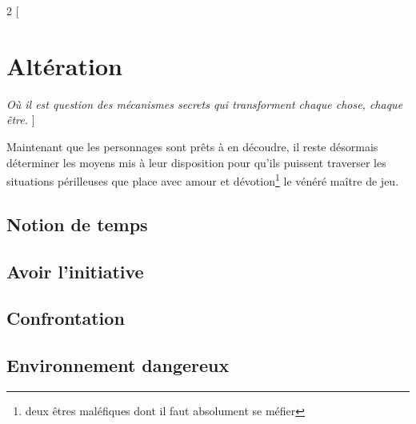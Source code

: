 \documentclass[11pt,oneside]{book}
\begin{document}
\begin{multicols}{2}
    [
        \chapter{Altération}
        \linebreak
        \emph{Où il est question des mécanismes secrets qui transforment chaque chose, chaque être.}
    ]

    Maintenant que les personnages sont prêts à en découdre, il reste désormais déterminer les moyens mis à leur disposition pour qu'ils puissent traverser les situations périlleuses que place avec amour et dévotion\footnote{deux êtres maléfiques dont il faut absolument se méfier} le vénéré maître de jeu.


    \section{Notion de temps}



    \section{Avoir l'initiative}



    \section{Confrontation}








    \section{Environnement dangereux}








\end{multicols}
\end{document}
